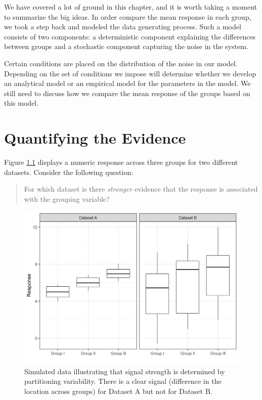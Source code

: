 \documentclass[
]{book}
\theoremstyle{plain}
\theoremstyle{mydefn}
\theoremstyle{myexmpl}
\theoremstyle{remark}
\begin{document}
We have covered a lot of ground in this chapter, and it is worth taking a moment to summarize the big ideas. In order compare the mean response in each group, we took a step back and modeled the data generating process. Such a model consists of two components: a deterministic component explaining the differences between groups and a stochastic component capturing the noise in the system.

Certain conditions are placed on the distribution of the noise in our model. Depending on the set of conditions we impose will determine whether we develop an analytical model or an empirical model for the parameters in the model. We still need to discuss how we compare the mean response of the groups based on this model.

\hypertarget{ANOVAteststat}{%
\chapter{Quantifying the Evidence}\label{ANOVAteststat}}

Figure \ref{fig:anovateststat-boxplots} displays a numeric response across three groups for two different datasets. Consider the following question:

\begin{quote}
For which dataset is there \emph{stronger} evidence that the response is associated with the grouping variable?
\end{quote}

\begin{figure}

{\centering \includegraphics[width=0.8\linewidth]{./Images/anovateststat-boxplots-1} 

}

\caption{Simulated data illustrating that signal strength is determined by partitioning variability. There is a clear signal (difference in the location across groups) for Dataset A but not for Dataset B.}\label{fig:anovateststat-boxplots}
\end{figure}
\end{document}
